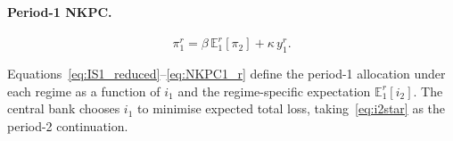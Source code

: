 \paragraph{Period-1 NKPC.}
\begin{equation}
  \pi_1^r = \beta\,\mathbb{E}_1^r[\pi_2] + \kappa\,y_1^r.
  \label{eq:NKPC1_r}
\end{equation}

Equations~\eqref{eq:IS1_reduced}--\eqref{eq:NKPC1_r} define the period-1 allocation
under each regime as a function of $i_1$ and the regime-specific expectation
$\mathbb{E}_1^r[i_2]$. The central bank chooses $i_1$ to minimise expected total loss,
taking~\eqref{eq:i2star} as the period-2 continuation.
